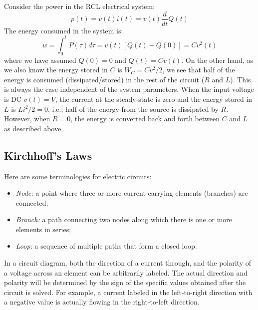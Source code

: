 \documentclass{article}
\begin{document}
Consider the power in the RCL electrical system:
\begin{equation} 
  p(t)=v(t) i(t) =v(t) \frac{d}{dt} Q(t) 
\end{equation}
The energy consumed in the system is:
\begin{equation} 
  w=\int_0^t P(\tau) d\tau=v(t) [Q(t)-Q(0)]=Cv^2(t) 
\end{equation}
where we have assumed $Q(0)=0$ and $Q(t)=Cv(t)$. On the other hand,
as we also know the energy stored in $C$ is $W_C=Cv^2/2$, we see that
half of the energy is consumed (dissipated/stored) in the rest of 
the circuit ($R$ and $L$). This is always the case independent of 
the system parameters. When the input voltage is DC $v(t)=V$, the 
current at the steady-state is zero and the energy stored in $L$ is 
$Li^2/2=0$, i.e., half of the energy from the source is dissipated
by $R$. However, when $R=0$, the energy is converted back and forth
between $C$ and $L$ as described above.


\subsection*{Kirchhoff's Laws}

Here are some terminologies for electric circuits:
\begin{itemize}
\item {\em Node:} a point where three or more current-carrying elements 
  (branches) are connected;
\item {\em Branch:} a path connecting two nodes along which there is 
  one or more elements in series; 
\item {\em Loop:} a sequence of multiple paths that form a closed loop.
\end{itemize}

In a circuit diagram, both the direction of a current through, and the
polarity of a voltage across an element can be arbitrarily labeled. 
The actual direction and polarity will be determined by the sign of 
the specific values obtained after the circuit is solved. For example, 
a current labeled in the left-to-right direction with a negative value
is actually flowing in the right-to-left direction.
\end{document}
